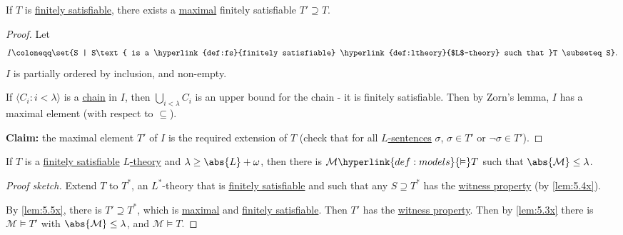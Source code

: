 \documentclass{article}
\let\models\vDash
\begin{document}
\begin{nlemma}\label{lem:5.5x}
  If $T$ is \hyperlink{def:fs}{finitely satisfiable}, there exists a \hyperlink{def:maximal}{maximal} finitely satisfiable $T' \supseteq T$.
\end{nlemma}
\begin{proof}
  Let
  \begin{equation*}
    I \coloneqq \set{S | S\text{ is a \hyperlink{def:fs}{finitely satisfiable} \hyperlink{def:ltheory}{$L$-theory} such that }T \subseteq S}.
  \end{equation*}
  $I$ is partially ordered by inclusion, and non-empty.

  If $\langle C_i : i < \lambda \rangle$ is a \hyperlink{def:chain}{chain} in $I$, then $\bigcup_{i < \lambda} C_i$ is an upper bound for the chain - it is finitely satisfiable.
  Then by Zorn's lemma, $I$ has a maximal element (with respect to $\subseteq$).

  \textbf{Claim:} the maximal element $T'$ of $I$ is the required extension of $T$ (check that for all \hyperlink{def:sentence}{$L$-sentences} $\sigma$, $\sigma \in T'$ or $\lnot \sigma \in T'$).
\end{proof}
\begin{nthm}[Compactness]\label{thm:5.6x}
  If $T$ is a \hyperlink{def:fs}{finitely satisfiable} \hyperlink{def:ltheory}{$L$-theory} and $\lambda \geq \abs{L} + \omega$, then there is $\mathcal{M} \hyperlink{def:models}{\models} T$ such that $\abs{\mathcal{M}} \leq \lambda$.
\end{nthm}
\begin{proof}[Proof sketch]
  Extend $T$ to $T^*$, an $L^*$-theory that is \hyperlink{def:fs}{finitely satisfiable} and such that any $S \supseteq T^*$ has the \hyperlink{def:wp}{witness property} (by \cref{lem:5.4x}).

  By \cref{lem:5.5x}, there is $T' \supseteq T^*$, which is \hyperlink{def:maximal}{maximal} and \hyperlink{def:fs}{finitely satisfiable}.
  Then $T'$ has the \hyperlink{def:wp}{witness property}.
  Then by \cref{lem:5.3x} there is $\mathcal{M} \models T'$ with $\abs{\mathcal{M}} \leq \lambda$, and $\mathcal{M} \models T$.
\end{proof}

\printindex
\end{document}
